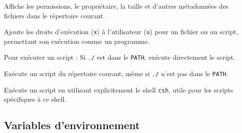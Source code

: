 \documentclass[a4paper]{report}
\begin{document}
    \begin{Concept}
    \noindent{}  
    Affiche les permissions, le propriétaire, la taille et d'autres métadonnées 
    des fichiers dans le répertoire courant. 
    \\\vspace{0.75em}

    \noindent{}  
    Ajoute les droits d'exécution (\texttt{x}) à l'utilisateur (\texttt{u}) pour un fichier 
    ou un script, permettant son exécution comme un programme. 
    \\\vspace{0.75em}

    Pour exécuter un script :
    \noindent {}  
    Si \texttt{./} est dans le \texttt{PATH}, exécute directement le script. 
    \\\vspace{0.75em} 

    \noindent  {}  
    Exécute un script du répertoire courant, même si \texttt{./} n'est pas dans le \texttt{PATH}. 
    \\\vspace{0.75em}

    \noindent  {}  
    Exécute un script en utilisant explicitement le shell \texttt{csh}, utile pour 
    les scripts spécifiques à ce shell.
    \end{Concept}

    \subsection{Variables d'environnement}
\end{document}
